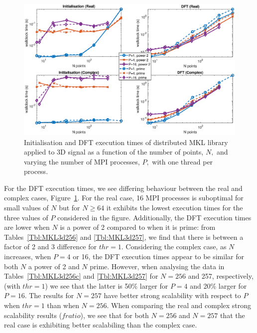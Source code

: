\documentclass[a4paper]{article}
\begin{document}
\begin{figure}[htb]
    \centering
    \includegraphics[width=0.9\linewidth]{../results/mkl_3d_mpi.eps}
  \caption{Initialisation and DFT execution times of distributed MKL library applied to 3D signal as a function of the
    number of points, $N,$ and varying the number of MPI processes, $P,$ with one thread per process.}
  \label{3DDistMKL}
\end{figure}

For the DFT execution times, we see differing behaviour between the
real and complex cases, Figure~\ref{3DDistMKL}. For the real case, 16
MPI processes is suboptimal for small values of $N$ but for $N\ge 64$
it exhibits the lowest execution times for the three values of $P$
considered in the figure. Additionally, the DFT execution times are
lower when $N$ is a power of 2 compared to when it is prime: from
Tables~\ref{Tbl:MKL3d256} and \ref{Tbl:MKL3d257}, we find that there
is between a factor of 2 and 3 difference for $thr=1.$ Considering the
complex case, as $N$ increases, when $P=4$ or 16, the DFT execution
times appear to be similar for both $N$ a power of 2 and $N$
prime. However, when analysing the data in Tables~\ref{Tbl:MKL3d256c}
and \ref{Tbl:MKL3d257} for $N=256$ and 257, respectively, (with
$thr=1$) we see that the latter is 50\% larger for $P=4$ and 20\%
larger for $P=16.$ The results for $N=257$ have better strong
scalability with respect to $P$ when $thr=1$ than when $N=256.$ When
comparing the real and complex strong scalability results ($fratio$),
we see that for both $N=256$ and $N=257$ that the real case is
exhibiting better scalabiling than the complex case.
\end{document}
